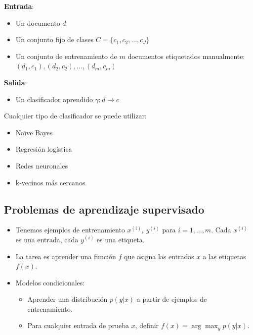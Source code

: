 \textbf{Entrada}:
\begin{itemize}
    \item Un documento $d$
    \item Un conjunto fijo de clases $C = \{c_1, c_2, \ldots, c_J\}$
    \item Un conjunto de entrenamiento de $m$ documentos etiquetados manualmente: $(d_1, c_1), (d_2, c_2), \ldots, (d_m, c_m)$
\end{itemize}

\textbf{Salida}:
\begin{itemize}
    \item Un clasificador aprendido $\gamma: d \to c$
\end{itemize}

Cualquier tipo de clasificador se puede utilizar:
\begin{itemize}
    \item Naïve Bayes
    \item Regresión logística
    \item Redes neuronales
    \item k-vecinos más cercanos
\end{itemize}

\subsection{Problemas de aprendizaje supervisado}
\begin{itemize}
    \item Tenemos ejemplos de entrenamiento $x^{(i)}$, $y^{(i)}$ para $i = 1, \ldots, m$. Cada $x^{(i)}$ es una entrada, cada $y^{(i)}$ es una etiqueta.
    \item La tarea es aprender una función $f$ que asigna las entradas $x$ a las etiquetas $f(x)$.
    \item Modelos condicionales:
    \begin{itemize}
        \item Aprender una distribución $p(y|x)$ a partir de ejemplos de entrenamiento.
        \item Para cualquier entrada de prueba $x$, definir $f(x) = \arg \max_y p(y|x)$.
    \end{itemize}
\end{itemize}

